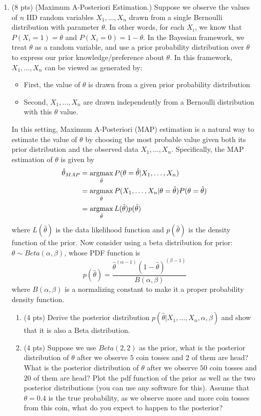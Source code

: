 \documentclass{article}
\def\argmax{\mathop{\rm argmax}}
\begin{document}
\begin{enumerate}
\item (8 pts) (Maximum A-Posteriori Estimation.)
Suppose we observe the values of $n$ IID random variables $X_1, \dots , X_n$ drawn from a single Bernoulli
distribution with parameter $\theta$. In other words, for each $X_i$, we know that $P(X_i = 1) =\theta$ and $P(X_i = 0) = 1- \theta$.
In the Bayesian framework, we treat $\theta$ as a random variable, and use a prior probability distribution over $\theta$ to express our prior knowledge/preference about $\theta$. In this framework,  $X_1, \dots, X_n$ can be viewed as generated by:
\begin{itemize}
\item First, the value of $\theta$ is drawn from a given prior probability distribution
\item Second, $X_1, \dots, X_n$ are drawn independently from a Bernoulli distribution with this $\theta$ value.
\end{itemize}
In this setting, Maximum A-Posteriori (MAP) estimation is a natural way to estimate the value of $\theta$ by choosing the most probable value given both its prior distribution and the observed data $X_1, \dots , X_n$. Specifically, the MAP estimation of $\theta$ is given by
\begin{align*}
\hat{\theta}_{MAP} & = \argmax_{\hat{\theta}}P(\theta=\hat{\theta}|X_1,\dots, X_n)\\
&=\argmax_{\hat{\theta}}P(X_1,\dots,X_n|\theta = \hat{\theta} )P(\theta=\hat{\theta})\\
& = \argmax_{\hat{\theta}}L(\hat{\theta})p(\hat{\theta})
\end{align*}
where $L(\hat{\theta})$ is the data likelihood function and $p(\hat{\theta})$ is the density function of the prior.  Now consider using a beta distribution for prior: $\theta \sim Beta(\alpha, \beta)$, whose PDF function is
\[p(\hat{\theta}) = \frac{\hat{\theta}^{(\alpha-1)}(1-\hat{\theta})^{(\beta-1)}}{B(\alpha, \beta)}\]
where $B(\alpha, \beta)$ is a normalizing constant to make it a proper probability density function.

\begin{enumerate}
\item (4 pts) Derive the posterior distribution $p(\hat{\theta}|X_1, \dots, X_n, \alpha, \beta)$ and show that it is also a Beta distribution. 
\item (4 pts) Suppose we use $Beta(2,2)$ as the prior, what is the posterior distribution of $\theta$ after we observe $5$ coin tosses and $2$ of them are head? What is the posterior distribution of $\theta$ after we observe $50$ coin tosses and $20$ of them are head? Plot the pdf function of the prior as well as the two posterior distributions (you can use any software for this). Assume that $\theta=0.4$ is the true probability, as we observe more and more coin tosses from this coin, what do you expect to happen to the posterior?


\end{enumerate}
\end{enumerate}
\end{document}
